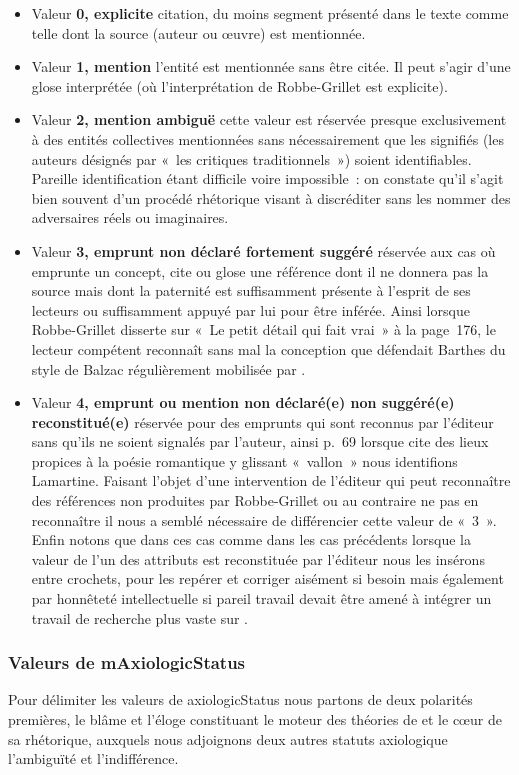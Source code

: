 \documentclass[12pt, a4paper]{article}
\begin{document}
\begin{itemize}
    \item Valeur \textbf{0, explicite} citation, du moins segment présenté dans le texte comme telle dont la source (auteur ou œuvre) est mentionnée.
    \item Valeur \textbf{1, mention} l'entité est mentionnée sans être citée. Il peut s'agir d'une glose interprétée (où l'interprétation de Robbe-Grillet est explicite).
    \item Valeur \textbf{2, mention ambiguë} cette valeur est réservée presque exclusivement à des entités collectives mentionnées sans nécessairement que les signifiés (les auteurs désignés par «~les critiques traditionnels~») soient identifiables. Pareille identification étant difficile voire impossible~: on constate qu'il s'agit bien souvent d'un procédé rhétorique visant à discréditer sans les nommer des adversaires réels ou imaginaires.
    \item Valeur \textbf{3, emprunt non déclaré fortement suggéré} réservée aux cas où \robbe{} emprunte un concept, cite ou glose une référence dont il ne donnera pas la source mais dont la paternité est suffisamment présente à l'esprit de ses lecteurs ou suffisamment appuyé par lui pour être inférée. Ainsi lorsque Robbe-Grillet disserte sur «~Le petit détail qui fait vrai~» à la page~176, le lecteur compétent reconnaît sans mal la conception que défendait Barthes du style de Balzac régulièrement mobilisée par \robbe.
    \item Valeur \textbf{4, emprunt ou mention non déclaré(e) non suggéré(e) reconstitué(e)} réservée pour des emprunts qui sont reconnus par l'éditeur sans qu'ils ne soient signalés par l'auteur, ainsi p.~69 lorsque \robbe{} cite des lieux propices à la poésie romantique y glissant «~vallon~» nous identifions Lamartine. Faisant l'objet d'une intervention de l'éditeur qui peut reconnaître des références non produites par Robbe-Grillet ou au contraire ne pas en reconnaître il nous a semblé nécessaire de différencier cette valeur de «~3~». Enfin notons que dans ces cas comme dans les cas précédents lorsque la valeur de l'un des attributs est reconstituée par l'éditeur nous les insérons entre crochets, pour les repérer et corriger aisément si besoin mais également par honnêteté intellectuelle si pareil travail devait être amené à intégrer un travail de recherche plus vaste sur \punr{}.
\end{itemize}

\subsubsection{Valeurs de mAxiologicStatus}
Pour délimiter les valeurs de axiologicStatus nous partons de deux polarités premières, le blâme et l'éloge constituant le moteur des théories de \robbe{} et le cœur de sa rhétorique, auxquels nous adjoignons deux autres statuts axiologique l'ambiguïté et l'indifférence. 
\end{document}

